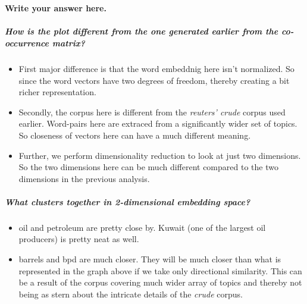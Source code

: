 \documentclass[11pt]{article}
\providecommand{\tightlist}{%
      \setlength{\itemsep}{0pt}\setlength{\parskip}{0pt}}
\begin{document}
    \begin{center}
    \end{center}
    { \hspace*{\fill} \\}
    
    \paragraph{Write your answer here.}\label{write-your-answer-here.}

\subparagraph{How is the plot different from the one generated earlier
from the co-occurrence
matrix?}\label{how-is-the-plot-different-from-the-one-generated-earlier-from-the-co-occurrence-matrix}

\begin{itemize}
\item
  First major difference is that the word embeddnig here isn't
  normalized. So since the word vectors have two degrees of freedom,
  thereby creating a bit richer representation.
\item
  Secondly, the corpus here is different from the \emph{reuters' crude}
  corpus used earlier. Word-pairs here are extraced from a significantly
  wider set of topics. So closeness of vectors here can have a much
  different meaning.
\item
  Further, we perform dimensionality reduction to look at just two
  dimensions. So the two dimensions here can be much different compared
  to the two dimensions in the previous analysis.
\end{itemize}

\subparagraph{What clusters together in 2-dimensional embedding
space?}\label{what-clusters-together-in-2-dimensional-embedding-space}

\begin{itemize}
\tightlist
\item
  oil and petroleum are pretty close by. Kuwait (one of the largest oil
  producers) is pretty neat as well.
\item
  barrels and bpd are much closer. They will be much closer than what is
  represented in the graph above if we take only directional similarity.
  This can be a result of the corpus covering much wider array of topics
  and thereby not being as stern about the intricate details of the
  \emph{crude} corpus.
\end{itemize}
\end{document}
